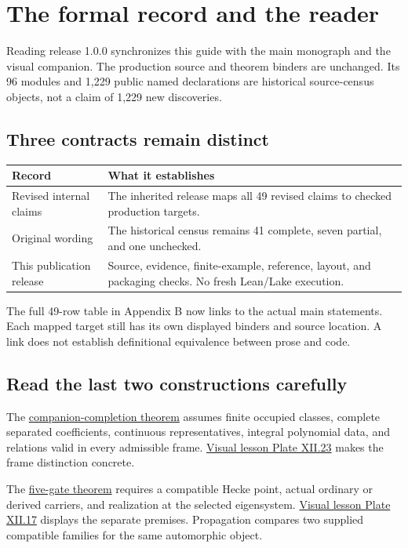 \section*{The formal record and the reader}
Reading release 1.0.0 synchronizes this guide with the main monograph and the visual companion. The production source and theorem binders are unchanged. Its 96 modules and 1,229 public named declarations are historical source-census objects, not a claim of 1,229 new discoveries.

\subsection*{Three contracts remain distinct}
\begin{center}\begin{tabular}{>{\raggedright\arraybackslash}p{.28\linewidth}>{\raggedright\arraybackslash}p{.62\linewidth}}\toprule
Record & What it establishes\\\midrule
Revised internal claims & The inherited release maps all 49 revised claims to checked production targets.\\
Original wording & The historical census remains 41 complete, seven partial, and one unchecked.\\
This publication release & Source, evidence, finite-example, reference, layout, and packaging checks. No fresh Lean/Lake execution.\\\bottomrule
\end{tabular}\end{center}
The full 49-row table in Appendix B now links to the actual main statements. Each mapped target still has its own displayed binders and source location. A link does not establish definitional equivalence between prose and code.

\subsection*{Read the last two constructions carefully}
The \href{p12-route:lean-completion}{companion-completion theorem} assumes finite occupied classes, complete separated coefficients, continuous representatives, integral polynomial data, and relations valid in every admissible frame. \href{p12-route:lean-visual23}{Visual lesson Plate XII.23} makes the frame distinction concrete.

The \href{p12-route:lean-five}{five-gate theorem} requires a compatible Hecke point, actual ordinary or derived carriers, and realization at the selected eigensystem. \href{p12-route:lean-visual17}{Visual lesson Plate XII.17} displays the separate premises. Propagation compares two supplied compatible families for the same automorphic object.

